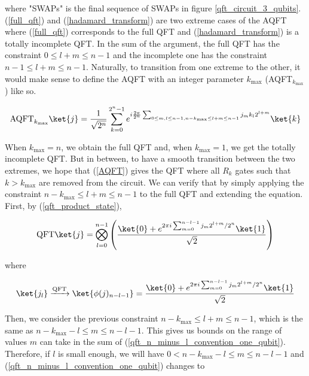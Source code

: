 where "SWAPs" is the final sequence of SWAPs in figure \ref{qft_circuit_3_qubits}. (\ref{full_qft}) and (\ref{hadamard_transform}) are two extreme cases of the AQFT where (\ref{full_qft}) corresponds to the full QFT and (\ref{hadamard_transform}) is a totally incomplete QFT. In the sum of the argument, the full QFT has the constraint $0 \leq l+m \leq n-1$ and the incomplete one has the constraint $n-1 \leq l+m \leq n-1$. Naturally, to transition from one extreme to the other, it would make sense to define the AQFT with an integer parameter $k_{\text{max}}$ (AQFT$_{k_\text{max}}$) like so.

\begin{equation}
    \text{AQFT}_{k_{\text{max}}}\ket{j} = \frac{1}{\sqrt{2^n}}\sum_{k=0}^{2^n - 1}e^{i\frac{2\pi}{2^n}\sum_{0 \leq m,l \leq n-1, n-k_{\text{max}} \leq l+m \leq n-1} j_mk_l 2^{l+m}}\ket{k}
    \label{AQFT}
\end{equation}

When $k_{\text{max}} = n$, we obtain the full QFT and, when $k_{\text{max}} = 1$, we get the totally incomplete QFT. But in between, to have a smooth transition between the two extremes, we hope that (\ref{AQFT}) gives the QFT where all $R_k$ gates such that $k>k_{\text{max}}$ are removed from the circuit. We can verify that by simply applying the constraint $n-k_{\text{max}} \leq l+m \leq n-1$ to the full QFT and extending the equation. First, by (\ref{qft_product_state}), 

\begin{equation}
    \text{QFT}\ket{j} = \bigotimes_{l=0}^{n-1}\left(\frac{\ket{0} + e^{2\pi i \sum_{m=0}^{n-l-1} j_m2^{l+m}/2^n}\ket{1}}{\sqrt{2}}\right)
    \label{qft_n_minus_l_convention}
\end{equation}

where

\begin{equation}
    \ket{j_l} \xrightarrow{\text{QFT}} \ket{\phi(j)_{n-l-1}} = \frac{\ket{0} + e^{2\pi i \sum_{m=0}^{n-l-1} j_m2^{l+m}/2^n}\ket{1}}{\sqrt{2}} 
    \label{qft_n_minus_l_convention_one_qubit}
\end{equation}

Then, we consider the previous constraint $n-k_{\text{max}} \leq l+m \leq n-1$, which is the same as $n-k_{\text{max}}-l \leq m \leq n-l-1$. This gives us bounds on the range of values $m$ can take in the sum of (\ref{qft_n_minus_l_convention_one_qubit}). Therefore, if $l$ is small enough, we will have $0 < n-k_{\text{max}}-l \leq m \leq n-l-1$ and (\ref{qft_n_minus_l_convention_one_qubit}) changes to

